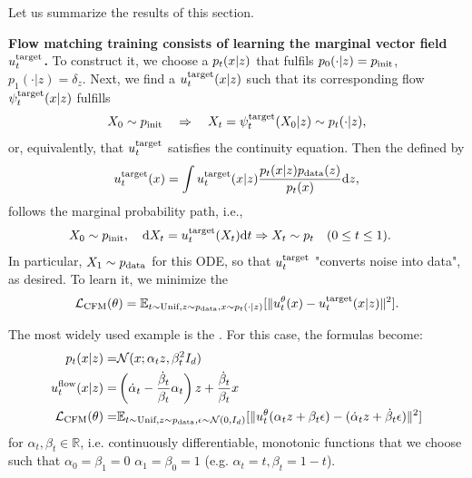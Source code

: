Let us summarize the results of this section.
\begin{summarybox}
\textbf{Flow matching training consists of learning the marginal vector field $u^{\text{target}}_t$.} To construct it, we choose a  $p_t(x|z)$ that fulfils $p_0(\cdot|z)=p_{\rm{init}}$, $p_1(\cdot|z)=\delta_{z}$. Next, we find a  $u^{\text{target}}_t(x|z)$ such that its corresponding flow $\psi^{\text{target}}_t(x|z)$ fulfills
\begin{align*}
    X_0\sim p_{\rm{init}} \quad \Rightarrow \quad X_t = \psi^{\text{target}}_t(X_0|z) \sim p_t(\cdot|z),
\end{align*}
or, equivalently, that $u^{\text{target}}_t$ satisfies the continuity equation.  Then the  defined by
\begin{align}
    \label{eq:marginal_vector_field_restated}
    u^{\text{target}}_t(x) = \int u^{\text{target}}_t(x|z)\frac{p_t(x|z)p_{\rm{data}}(z)}{p_t(x)}\mathrm{d} z,
\end{align}
follows the marginal probability path, i.e.,
\begin{align}
    \label{eq:marginal_ode_follows_marginal_path_restated}
    X_0&\sim p_{\rm{init}},\quad \mathrm{d} X_t =u^{\text{target}}_t(X_t)\mathrm{d} t\Rightarrow X_t\sim p_t\quad (0\leq t\leq 1).
\end{align}
In particular, $X_1\sim p_{\rm{data}}$ for this ODE, so that $u^{\text{target}}_t$ "converts noise into data", as desired. To learn it, we minimize the 
\begin{align}
\mathcal{L}_{\text{CFM}}(\theta) =     \mathbb{E}_{t\sim \text{Unif}, z\sim p_{\rm{data}}, x\sim p_t(\cdot|z)}[\|u_t^\theta(x) - u^{\text{target}}_t(x|z)\|^2].
\end{align}

The most widely used example is the . For this case, the formulas become:
\begin{align}
p_t(x|z) =& \mathcal{N}(x;\alpha_t z,\beta_t^2 I_d)\\
u^{\text{flow}}_t(x|z)=&\left(\dot{\alpha}_t-\frac{\dot{\beta}_t}{\beta_t}\alpha_t\right)z+\frac{\dot{\beta}_t}{\beta_t}x\\
\mathcal{L}_{\text{CFM}}(\theta) =&\mathbb{E}_{t\sim\text{Unif},z\sim p_{\rm{data}}, \epsilon\sim \mathcal{N}(0,I_d)}[\|u_t^\theta(\alpha_tz+\beta_t\epsilon)-(\dot{\alpha}_tz+\dot{\beta}_t\epsilon)\|^2]
\end{align}
for  $\alpha_t,\beta_t\in\mathbb{R}$, i.e. continuously differentiable, monotonic functions that we choose such that $\alpha_0=\beta_1=0$ $\alpha_1=\beta_0=1$ (e.g. $\alpha_t=t,\beta_t=1-t$).
\end{summarybox}
